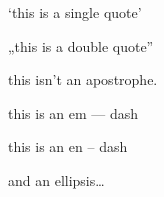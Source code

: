
\def\mytitle{MultiMarkdown Dutch Test}


`this is a single quote'

„this is a double quote''

this isn't an apostrophe.

this is an em --- dash

this is an en -- dash

and an ellipsis{\ldots}




